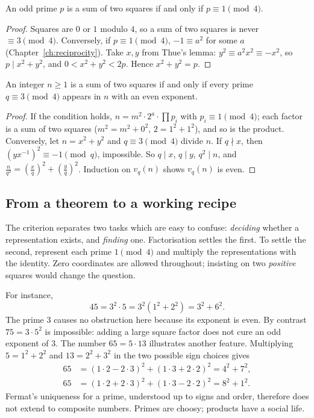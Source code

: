 \begin{theorem}\label{thm:twosq}
An odd prime $p$ is a sum of two squares if and only if $p\equiv1\pmod4$.
\end{theorem}
\begin{proof}
Squares are $0$ or $1$ modulo $4$, so a sum of two squares is never $\equiv3\pmod4$. Conversely, if $p\equiv1\pmod4$, $-1\equiv a^2$ for some $a$ (Chapter~\ref{ch:reciprocity}). Take $x,y$ from Thue's lemma: $y^2\equiv a^2x^2\equiv-x^2$, so $p\mid x^2+y^2$, and $0<x^2+y^2<2p$. Hence $x^2+y^2=p$.
\end{proof}

\begin{theorem}\label{thm:twosqn}
An integer $n\ge1$ is a sum of two squares if and only if every prime $q\equiv3\pmod4$ appears in $n$ with an even exponent.
\end{theorem}
\begin{proof}
If the condition holds, $n=m^2\cdot2^a\cdot\prod p_i$ with $p_i\equiv1\pmod4$; each factor is a sum of two squares ($m^2=m^2+0^2$, $2=1^2+1^2$), and so is the product. Conversely, let $n=x^2+y^2$ and $q\equiv3\pmod4$ divide $n$. If $q\nmid x$, then $\left(yx^{-1}\right)^2\equiv-1\pmod q$, impossible. So $q\mid x$, $q\mid y$, $q^2\mid n$, and $\frac n{q^2}=\left(\frac xq\right)^2+\left(\frac yq\right)^2$. Induction on $v_q(n)$ shows $v_q(n)$ is even.
\end{proof}

\subsection*{From a theorem to a working recipe}
The criterion separates two tasks which are easy to confuse: \emph{deciding} whether a representation exists, and \emph{finding} one. Factorisation settles the first. To settle the second, represent each prime $1\pmod4$ and multiply the representations with the identity. Zero coordinates are allowed throughout; insisting on two \emph{positive} squares would change the question.

For instance,
\[
45=3^2\cdot5=3^2(1^2+2^2)=3^2+6^2.
\]
The prime $3$ causes no obstruction here because its exponent is even. By contrast $75=3\cdot5^2$ is impossible: adding a large square factor does not cure an odd exponent of $3$. The number $65=5\cdot13$ illustrates another feature. Multiplying $5=1^2+2^2$ and $13=2^2+3^2$ in the two possible sign choices gives
\[
\begin{aligned}
65&=(1\cdot2-2\cdot3)^2+(1\cdot3+2\cdot2)^2=4^2+7^2,\\
65&=(1\cdot2+2\cdot3)^2+(1\cdot3-2\cdot2)^2=8^2+1^2.
\end{aligned}
\]
Fermat's uniqueness for a prime, understood up to signs and order, therefore does not extend to composite numbers. Primes are choosy; products have a social life.

